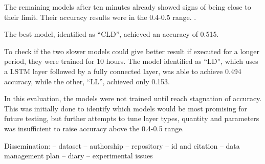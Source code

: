 The remaining models after ten minutes already showed signs of being close to their limit.
Their accuracy results were in the 0.4-0.5 range. .

The best model, identified as ``CLD'', achieved an accuracy of 0.515.

To check if the two slower models could give better result if executed for a longer period, they were trained for 10 hours. The model identified as ``LD'', which uses a LSTM layer followed by a fully connected layer, was able to achieve 0.494 accuracy, while the other, ``LL'', achieved only 0.153.




In this evaluation, the models were not trained until reach stagnation of accuracy. This was initially done to identify which models would be most promising for future testing, but further attempts to tune layer types, quantity and parameters was insufficient to raise accuracy above the 0.4-0.5 range.






Dissemination:
-- dataset
-- authorship
-- repository
-- id and citation
-- data management plan
-- diary
-- experimental issues

